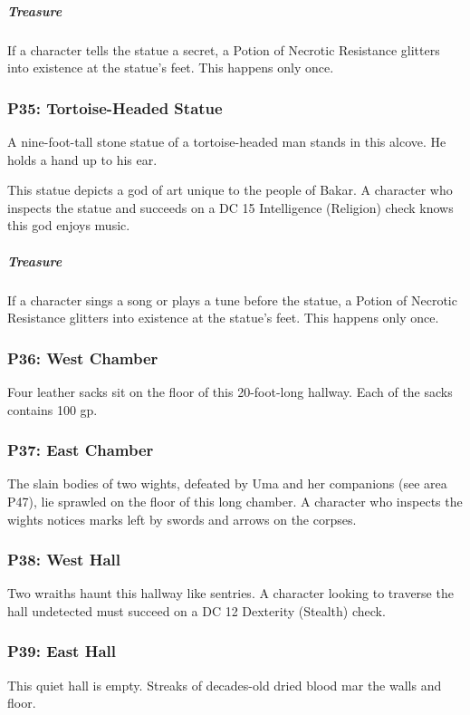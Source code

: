 \documentclass[10pt,a4paper,twoside,bg=print,twocolumn,openany,nodeprecatedcode]{dndbook}
\begin{document}
\subparagraph{Treasure}
If a character tells the statue a secret, a Potion of Necrotic Resistance glitters into existence at the statue's feet. This happens only once.

\subsubsection{P35: Tortoise-Headed Statue}
\begin{DndReadAloud}{}
A nine-foot-tall stone statue of a tortoise-headed man stands in this alcove. He holds a hand up to his ear.

\end{DndReadAloud}

This statue depicts a god of art unique to the people of Bakar. A character who inspects the statue and succeeds on a DC 15 Intelligence (Religion) check knows this god enjoys music.

\subparagraph{Treasure}
If a character sings a song or plays a tune before the statue, a Potion of Necrotic Resistance glitters into existence at the statue's feet. This happens only once.

\subsubsection{P36: West Chamber}
Four leather sacks sit on the floor of this 20-foot-long hallway. Each of the sacks contains 100 gp.

\subsubsection{P37: East Chamber}
The slain bodies of two wights, defeated by Uma and her companions (see area P47), lie sprawled on the floor of this long chamber. A character who inspects the wights notices marks left by swords and arrows on the corpses.

\subsubsection{P38: West Hall}
Two wraiths haunt this hallway like sentries. A character looking to traverse the hall undetected must succeed on a DC 12 Dexterity (Stealth) check.

\subsubsection{P39: East Hall}
This quiet hall is empty. Streaks of decades-old dried blood mar the walls and floor.
\end{document}
